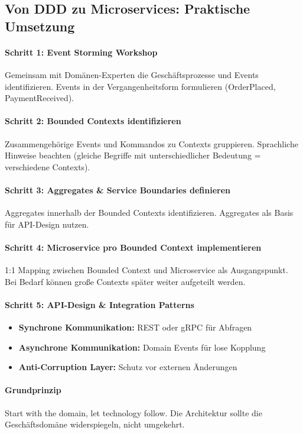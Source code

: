 \subsection{Von DDD zu Microservices: Praktische Umsetzung}
\label{subsec:ddd-zu-microservices}

\paragraph{Schritt 1: Event Storming Workshop}
Gemeinsam mit Domänen-Experten die Geschäftsprozesse und Events identifizieren. Events in der Vergangenheitsform formulieren (OrderPlaced, PaymentReceived).

\paragraph{Schritt 2: Bounded Contexts identifizieren}
Zusammengehörige Events und Kommandos zu Contexts gruppieren. Sprachliche Hinweise beachten (gleiche Begriffe mit unterschiedlicher Bedeutung = verschiedene Contexts).

\paragraph{Schritt 3: Aggregates \& Service Boundaries definieren}
Aggregates innerhalb der Bounded Contexts identifizieren. Aggregates als Basis für API-Design nutzen.

\paragraph{Schritt 4: Microservice pro Bounded Context implementieren}
1:1 Mapping zwischen Bounded Context und Microservice als Ausgangspunkt. Bei Bedarf können große Contexts später weiter aufgeteilt werden.

\paragraph{Schritt 5: API-Design \& Integration Patterns}
\begin{itemize}
\item \textbf{Synchrone Kommunikation:} REST oder gRPC für Abfragen
\item \textbf{Asynchrone Kommunikation:} Domain Events für lose Kopplung
\item \textbf{Anti-Corruption Layer:} Schutz vor externen Änderungen
\end{itemize}

\paragraph{Grundprinzip}
Start with the domain, let technology follow. Die Architektur sollte die Geschäftsdomäne widerspiegeln, nicht umgekehrt.
